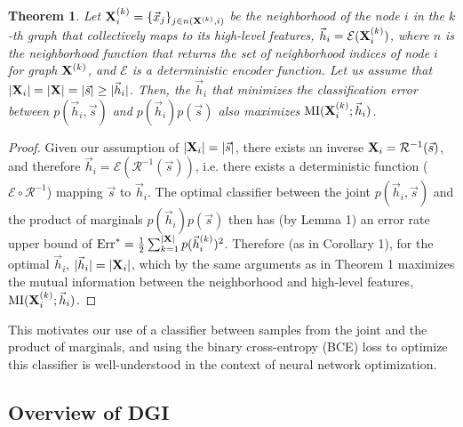 \documentclass{article} \usepackage{iclr2019_conference,times}
\newtheorem{theo}{Theorem}
\begin{document}
\begin{theo}
Let ${\bf X}^{(k)}_i = \{\vec{x}_j\}_{j \in n({\bf X}^{(k)}, i)}$ be the neighborhood of the node $i$ in the $k$-th graph that collectively maps to its high-level features, $\vec{h}_i = \mathcal{E}({\bf X}^{(k)}_i)$, where $n$ is the neighborhood function that returns the set of neighborhood indices of node $i$ for graph ${\bf X}^{(k)}$, and $\mathcal{E}$ is a deterministic encoder function.
Let us assume that $|{\bf X}_i| = |{\bf X}| = |\vec{s}| \geq |\vec{h}_i|$.
Then, the $\vec{h}_i$ that minimizes the classification error between $p(\vec{h}_i,\vec{s})$ and $p(\vec{h}_i)p(\vec{s})$ also maximizes $\mathrm{MI}({\bf X}^{(k)}_i; \vec{h}_i)$.
\end{theo}
\begin{proof}
Given our assumption of $|{\bf X}_i| = |\vec{s}|$, there exists an inverse ${\bf X}_i = \mathcal{R}^{-1}(\vec{s})$, and therefore $\vec{h}_i = \mathcal{E}(\mathcal{R}^{-1}(\vec{s}))$, i.e. there exists a deterministic function ($\mathcal{E}\circ\mathcal{R}^{-1}$) mapping $\vec{s}$ to $\vec{h}_i$.
The optimal classifier between the joint $p(\vec{h}_i, \vec{s})$ and the product of marginals $p(\vec{h}_i)p(\vec{s})$ then has (by Lemma 1) an error rate upper bound of $\mathrm{Err}^* = \frac{1}{2} \sum_{k=1}^{|{\bf X}|} p(\vec{h}_i^{(k)})^2$.
Therefore (as in Corollary 1), for the optimal $\vec{h}_i$, $|\vec{h}_i| = |{\bf X}_i|$, which by the same arguments as in Theorem 1 maximizes the mutual information between the neighborhood and high-level features, $\mathrm{MI}({\bf X}^{(k)}_i; \vec{h}_i)$.
\end{proof}

This motivates our use of a classifier between samples from the joint and the product of marginals, and using the binary cross-entropy (BCE) loss to optimize this classifier is well-understood in the context of neural network optimization.

\subsection{Overview of DGI}\label{sec:algo}
\end{document}
